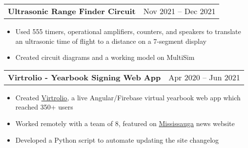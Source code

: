 \documentclass[a4paper,10pt]{article}
\begin{document}
\begin{tabularx}{\linewidth}{@{}X r@{}}
\begin{minipage}[t]{\linewidth}
  \textbf{Ultrasonic Range Finder Circuit}
\end{minipage}
&     Nov 2021 -- Dec 2021
\\[3.75pt]
\end{tabularx}
\begin{itemize}[nosep,after=\strut, leftmargin=1em, itemsep=3pt,label=--]
  \item Used 555 timers, operational amplifiers, counters, and speakers to translate an ultrasonic time of flight to a distance on a 7-segment display
\item Created circuit diagrams and a working model on MultiSim
\end{itemize}
\begin{tabularx}{\linewidth}{@{}X r@{}}
\begin{minipage}[t]{\linewidth}
  \textbf{Virtrolio - Yearbook Signing Web App}
\end{minipage}
&     Apr 2020 -- Jun 2021
\\[3.75pt]
\end{tabularx}
\begin{itemize}[nosep,after=\strut, leftmargin=1em, itemsep=3pt,label=--]
  \item Created \href{https://virtrolio.web.app/}{Virtrolio}\textit{, }a live Angular/Firebase virtual yearbook web app which reached 350+ users
\item Worked remotely with a team of 8, featured on \href{https://www.mississauga.com/community-story/10071561--something-to-cherish-former-mississauga-students-launch-online-yearbook/}{Mississauga} news website
\item Developed a Python script to automate updating the site changelog
\end{itemize}
\end{document}
